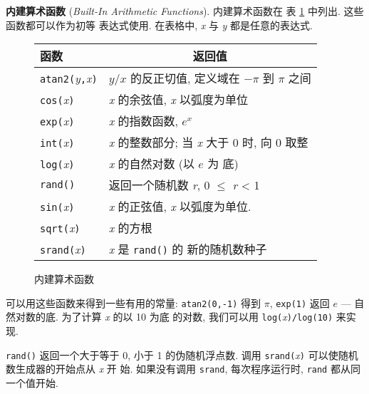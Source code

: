 \textbf{内建算术函数} (\emph{Built-In Arithmetic Functions}). 内建算术函数在
表 \ref{tbl:built_in_arithmetic_functions} 中列出. 这些函数都可以作为初等
表达式使用. 在表格中, \textit{x} 与 \textit{y} 都是任意的表达式.

\begin{figure}[ht]
\captionsetup{type=table}
\caption{内建算术函数}
\label{tbl:built_in_arithmetic_functions}
\begin{center}
    \begin{tabular}{l|l}
        \hline
        \hline
        函数    & \multicolumn{1}{c}{返回值}    \\
        \hline
        \verb'atan2('\textit{y}\verb','\textit{x}\verb')'   & $y/x$ 的反正切值,
        定义域在 $-\pi$ 到 $\pi$ 之间   \\
        \verb'cos('\textit{x}\verb')'   & \textit{x} 的余弦值, \textit{x}
        以弧度为单位    \\
        \verb'exp('\textit{x}\verb')'   & \textit{x} 的指数函数, $e^x$ \\
        \verb'int('\textit{x}\verb')'   & \textit{x} 的整数部分; 当
        \textit{x} 大于 0 时, 向 0 取整 \\
        \verb'log('\textit{x}\verb')'   & \textit{x} 的自然对数 (以 $e$ 为
        底)  \\
        \verb'rand()'   & 返回一个随机数 \textit{r}, 0 $\le$ \textit{r}
        < 1 \\
        \verb'sin('\textit{x}\verb')'   & \textit{x} 的正弦值, \textit{x}
        以弧度为单位.   \\
        \verb'sqrt('\textit{x}\verb')'  & \textit{x} 的方根 \\
        \verb'srand('\textit{x}\verb')' & \textit{x} 是 \verb'rand()' 的
        新的随机数种子  \\
        \hline
    \end{tabular}
\end{center}
\end{figure}

可以用这些函数来得到一些有用的常量: \verb'atan2(0,-1)' 得到 $\pi$,
\verb'exp(1)' 返回 $e$ --- 自然对数的底. 为了计算 \textit{x} 的以 10 为底
的对数, 我们可以用 \verb'log('\textit{x}\verb')/log(10)' 来实现.

\verb'rand()' 返回一个大于等于 0, 小于 1 的伪随机浮点数. 调用
\verb'srand('\textit{x}\verb')' 可以使随机数生成器的开始点从 \textit{x} 开
始. 如果没有调用 \verb'srand', 每次程序运行时, \verb'rand'
都从同一个值开始.

